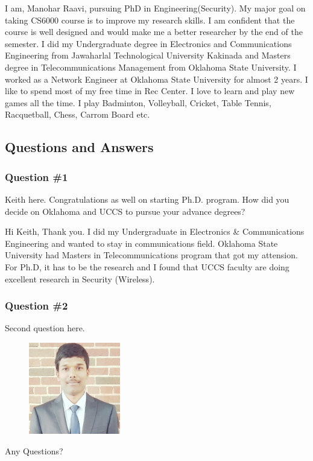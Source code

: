 
I am, Manohar Raavi, pursuing PhD in Engineering(Security). My major goal on taking CS6000 course is to improve my research skills. 
I am confident that the course is well designed and would make me a better researcher by the end of the semester.
 I did my Undergraduate degree in Electronics and Communications Engineering from Jawaharlal Technological University Kakinada and Masters degree in Telecommunications Management from Oklahoma State University. I worked as a Network Engineer at Oklahoma State University for almost 2 years. I like to spend most of my free time in Rec Center.
 I love to learn and play new games all the time. I play Badminton, Volleyball, Cricket, Table Tennis, Racquetball, Chess, Carrom Board etc.

\subsection{Questions and Answers}
\subsubsection {Question \#1}
Keith here. Congratulations as well on starting Ph.D. program. How did you decide on Oklahoma and UCCS to pursue your advance degrees?

Hi Keith,
Thank you. I did my Undergraduate in Electronics \& Communications Engineering and wanted to stay in communications field.
Oklahoma State University had Masters in Telecommunications program that got my attension. For Ph.D, it has to be the research and I found that UCCS faculty are doing excellent research in Security (Wireless).



\subsubsection {Question \#2}

Second question here.

\begin{figure}[htp]
    \centering
    \includegraphics[width=4cm]{linkd1}
\end{figure}

Any Questions?